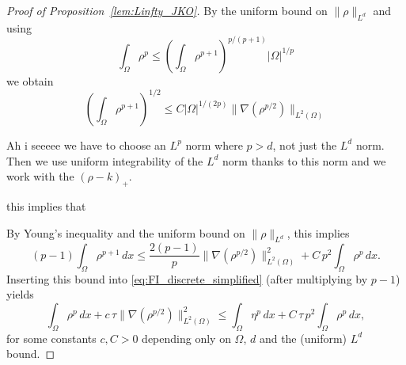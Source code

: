 \documentclass[a4paper,twosided, 11pt]{article}
\renewcommand{\color}[2][]{}
\theoremstyle{plain}
\theoremstyle{remark}
\numberwithin{equation}{section}
\begin{document}
{\begin{proof}[Proof of Proposition~\ref{lem:Linfty_JKO}]
\iffalse

{\color{orange}By the uniform bound on $\|\rho\|_{L^d}$ and using
$$
\int_{\Omega}\rho^p\le \left(\int_{\Omega}\rho^{p+1}\right)^{p/(p+1)}|\Omega|^{1/p}
$$
we obtain 
$$
\left(\int_{\Omega}\rho^{p+1}\right)^{1/2}\le C|\Omega|^{1/(2p)}\|\nabla(\rho^{p/2})\|_{L^2(\Omega)}
$$



Ah i seeeee we have to choose an $L^p$ norm where $p>d$, not just the $L^d$ norm. Then we use uniform integrability of the $L^d$ norm thanks to this norm and we work with the $(\rho-k)_{+}$.



this implies that 




}






By Young's inequality and the uniform bound on $\|\rho\|_{L^d}$, this implies
\[
(p-1)\int_\Omega \rho^{p+1}\,dx
\le
\frac{2(p-1)}{p}\|\nabla(\rho^{p/2})\|_{L^2(\Omega)}^2
+ C\,p^2\int_\Omega \rho^p\,dx .
\]
Inserting this bound into \eqref{eq:FI_discrete_simplified} (after multiplying by $p-1$) yields
\begin{equation}\label{eq:setup_Alikakos}
\int_\Omega \rho^p\,dx + c\,\tau \|\nabla(\rho^{p/2})\|_{L^2(\Omega)}^2
\le
\int_\Omega \eta^p\,dx + C\,\tau\,p^2\int_\Omega \rho^p\,dx,
\end{equation}
for some constants $c,C>0$ depending only on $\Omega$, $d$ and the (uniform) $L^d$ bound.


\end{proof}}
\end{document}
